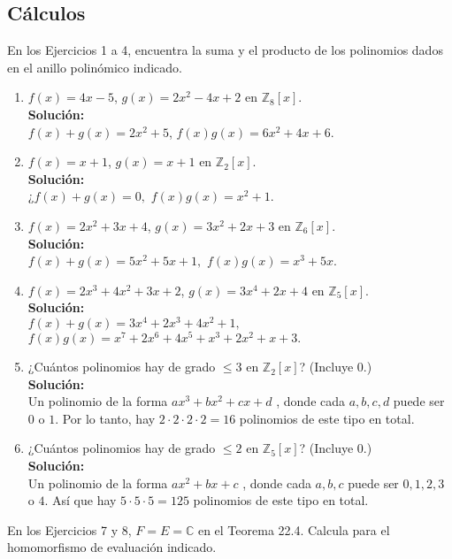 

\subsection*{Cálculos}
\noindent
En los Ejercicios 1 a 4, encuentra la suma y el producto de los polinomios dados en el anillo polinómico indicado.
\begin{enumerate}
	\item $f(x) = 4x - 5$, $g(x) = 2x^2 - 4x + 2$ en $\mathbb{Z}_8[x]$.
	\\ \textbf{Solución:} \\
	$f(x) + g(x) = 2x^2 + 5$, \quad $f(x)g(x) = 6x^2 + 4x + 6.$
	\item $f(x) = x + 1$, $g(x) = x + 1$ en $\mathbb{Z}_2[x]$.
	\\ \textbf{Solución:} \\
	¿$f(x) + g(x) = 0,$ \quad $f(x)g(x) = x^2 + 1.$
	\item $f(x) = 2x^2 + 3x + 4$, $g(x) = 3x^2 + 2x + 3$ en $\mathbb{Z}_6[x]$.
	\\ \textbf{Solución:} \\
	$f(x) + g(x) = 5x^2 + 5x + 1,$ \quad $f(x)g(x) = x^3 + 5x.$
	\item $f(x) = 2x^3 + 4x^2 + 3x + 2$, $g(x) = 3x^4 + 2x + 4$ en $\mathbb{Z}_5[x]$.
	\\ \textbf{Solución:} \\
	$f(x) + g(x) = 3x^4 + 2x^3 + 4x^2 + 1,$ \\
	$f(x)g(x) = x^7 + 2x^6 + 4x^5 + x^3 + 2x^2 + x + 3.$
	
	\item ¿Cuántos polinomios hay de grado $\leq 3$ en $\mathbb{Z}_2[x]$? (Incluye 0.)
	\\ \textbf{Solución:} \\
	Un polinomio de la forma  $ax^3 + bx^2 + cx + d$ , donde cada $a, b, c, d$  puede ser  $0$  o  $1$. 
	Por lo tanto, hay  $2 \cdot 2 \cdot 2 \cdot 2 = 16$  polinomios de este tipo en total.
	\item ¿Cuántos polinomios hay de grado $\leq 2$ en $\mathbb{Z}_5[x]$? (Incluye 0.)
	\\ \textbf{Solución:} \\
	Un polinomio de la forma  $ax^2 + bx + c$ , donde cada $a, b, c$  puede ser  $0, 1, 2, 3$  o  $4.$
	Así que hay $5 \cdot 5 \cdot 5 = 125$  polinomios de este tipo en total.
\end{enumerate}
En los Ejercicios 7 y 8, $F = E = \mathbb{C}$ en el Teorema 22.4. Calcula para el homomorfismo de evaluación indicado.
